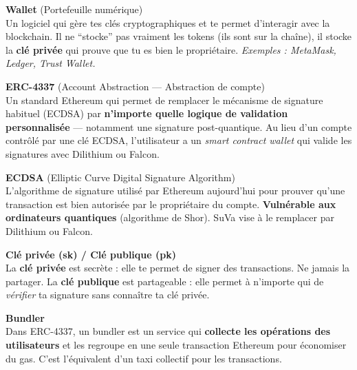 \documentclass[12pt, a4paper]{article}
\begin{document}
\begin{tcolorbox}[colback=gray!4, colframe=gray!50, breakable]

\textbf{Wallet} (Portefeuille numérique)\\
\hspace*{1em} Un logiciel qui gère tes clés cryptographiques et te permet d'interagir avec
la blockchain. Il ne ``stocke'' pas vraiment les tokens (ils sont sur la chaîne), il stocke
la \textbf{clé privée} qui prouve que tu es bien le propriétaire.
\textit{Exemples : MetaMask, Ledger, Trust Wallet.}

\vspace{0.4cm}

\textbf{ERC-4337} (Account Abstraction --- Abstraction de compte)\\
\hspace*{1em} Un standard Ethereum qui permet de remplacer le mécanisme de signature habituel
(ECDSA) par \textbf{n'importe quelle logique de validation personnalisée} --- notamment une
signature post-quantique. Au lieu d'un compte contrôlé par une clé ECDSA, l'utilisateur a
un \textit{smart contract wallet} qui valide les signatures avec Dilithium ou Falcon.

\vspace{0.4cm}

\textbf{ECDSA} (Elliptic Curve Digital Signature Algorithm)\\
\hspace*{1em} L'algorithme de signature utilisé par Ethereum aujourd'hui pour prouver qu'une
transaction est bien autorisée par le propriétaire du compte. \textbf{Vulnérable aux ordinateurs
quantiques} (algorithme de Shor). SuVa vise à le remplacer par Dilithium ou Falcon.

\vspace{0.4cm}

\textbf{Clé privée (sk) / Clé publique (pk)}\\
\hspace*{1em} La \textbf{clé privée} est secrète : elle te permet de signer des transactions.
Ne jamais la partager. La \textbf{clé publique} est partageable : elle permet à n'importe qui
de \textit{vérifier} ta signature sans connaître ta clé privée.

\vspace{0.4cm}

\textbf{Bundler}\\
\hspace*{1em} Dans ERC-4337, un bundler est un service qui \textbf{collecte les opérations des
utilisateurs} et les regroupe en une seule transaction Ethereum pour économiser du gas. C'est
l'équivalent d'un taxi collectif pour les transactions.


\end{tcolorbox}
\end{document}
